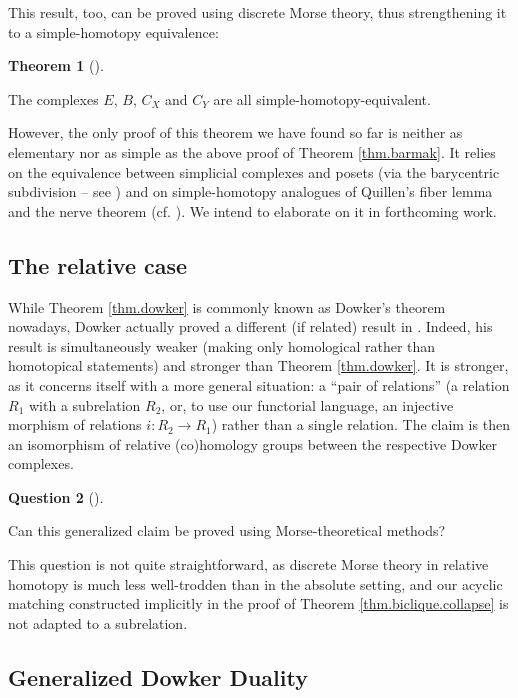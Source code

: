 \documentclass[numbers=enddot,12pt,final,onecolumn,notitlepage]{scrartcl}%
\theoremstyle{definition}
\newtheorem{theo}{Theorem}[section]
\newenvironment{theorem}[1][]
{\begin{theo}[#1]\begin{leftbar}}
{\end{leftbar}\end{theo}}
\newtheorem{quest}[theo]{Question}
\newenvironment{question}[1][]
{\begin{quest}[#1]\begin{leftbar}}
{\end{leftbar}\end{quest}}
\newenvironment{question}[1][Question]{\noindent\textbf{#1.} }{\ \rule{0.5em}{0.5em}}
\begin{document}
This result, too, can be proved using discrete Morse theory,
thus strengthening it to a simple-homotopy equivalence:

\begin{theorem}
\label{thm.E.she}The complexes $E$, $B$, $C_{X}$ and $C_{Y}$ are all
simple-homotopy-equivalent.
\end{theorem}

However, the only proof of this theorem we have found so far
is neither as elementary nor as simple as the above proof of
Theorem \ref{thm.barmak}.
It relies on the equivalence between simplicial complexes and
posets (via the barycentric subdivision -- see
\cite[proof of Proposition 9.29]{Kozlov20}) and on
simple-homotopy analogues of Quillen's fiber lemma and
the nerve theorem (cf. \cite{Barmak11}).
We intend to elaborate on it in forthcoming work.

% 

\subsection{The relative case}

While Theorem \ref{thm.dowker} is commonly known as Dowker's theorem
nowadays, Dowker actually proved a different (if related) result in
\cite[Theorems 1 and 1a]{Dowker52}. Indeed, his result is simultaneously
weaker (making only homological rather than homotopical statements)
and stronger than Theorem \ref{thm.dowker}.
It is stronger, as it concerns itself with a more general situation:
a ``pair of relations'' (a relation $R_1$ with a subrelation $R_2$,
or, to use our functorial language, an injective morphism of relations
$i : R_2 \to R_1$) rather than a single relation.
The claim is then an isomorphism of relative (co)homology groups
between the respective Dowker complexes.

\begin{question}
Can this generalized claim be proved using Morse-theoretical
methods?
\end{question}

This question is not quite straightforward, as
discrete Morse theory in relative homotopy is much less
well-trodden than in the absolute setting, and our
acyclic matching constructed implicitly in the proof of
Theorem \ref{thm.biclique.collapse} is not adapted to a
subrelation.

\subsection{Generalized Dowker Duality}
\end{document}
